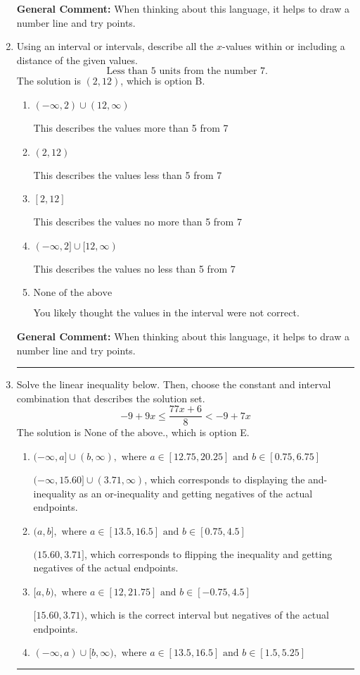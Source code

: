\documentclass{extbook}[14pt]
\newcommand{\litem}[1]{\item #1

\rule{\textwidth}{0.4pt}}
\begin{document}
\begin{enumerate}
{\textbf{General Comment:} When thinking about this language, it helps to draw a number line and try points.
}
\litem{
Using an interval or intervals, describe all the $x$-values within or including a distance of the given values.
\[ \text{ Less than } 5 \text{ units from the number } 7. \]The solution is \( (2, 12) \), which is option B.\begin{enumerate}[label=\Alph*.]
\item \( (-\infty, 2) \cup (12, \infty) \)

This describes the values more than 5 from 7
\item \( (2, 12) \)

This describes the values less than 5 from 7
\item \( [2, 12] \)

This describes the values no more than 5 from 7
\item \( (-\infty, 2] \cup [12, \infty) \)

This describes the values no less than 5 from 7
\item \( \text{None of the above} \)

You likely thought the values in the interval were not correct.
\end{enumerate}

\textbf{General Comment:} When thinking about this language, it helps to draw a number line and try points.
}
\litem{
Solve the linear inequality below. Then, choose the constant and interval combination that describes the solution set.
\[ -9 + 9 x \leq \frac{77 x + 6}{8} < -9 + 7 x \]The solution is \( \text{None of the above.} \), which is option E.\begin{enumerate}[label=\Alph*.]
\item \( (-\infty, a] \cup (b, \infty), \text{ where } a \in [12.75, 20.25] \text{ and } b \in [0.75, 6.75] \)

$(-\infty, 15.60] \cup (3.71, \infty)$, which corresponds to displaying the and-inequality as an or-inequality and getting negatives of the actual endpoints.
\item \( (a, b], \text{ where } a \in [13.5, 16.5] \text{ and } b \in [0.75, 4.5] \)

$(15.60, 3.71]$, which corresponds to flipping the inequality and getting negatives of the actual endpoints.
\item \( [a, b), \text{ where } a \in [12, 21.75] \text{ and } b \in [-0.75, 4.5] \)

$[15.60, 3.71)$, which is the correct interval but negatives of the actual endpoints.
\item \( (-\infty, a) \cup [b, \infty), \text{ where } a \in [13.5, 16.5] \text{ and } b \in [1.5, 5.25] \)


\end{enumerate}}
\end{enumerate}
\end{document}
